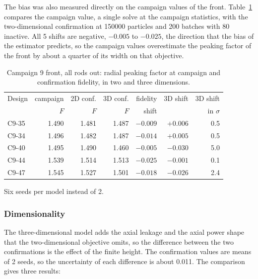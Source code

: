 The bias was also measured directly on the campaign values of the
front. Table~\ref{tab:c9-peaking} compares the campaign value, a single solve
at the campaign statistics, with the two-dimensional confirmation at
\num{150000} particles and 200 batches with 80 inactive. All 5 shifts
are negative, $-0.005$ to $-0.025$, the direction that the bias of the
estimator predicts, so the campaign values overestimate the peaking
factor of the front by about a quarter of its width on that objective.

\begin{table}[htbp]
  \centering
  \begin{threeparttable}
  \caption{Campaign 9 front, all rods out: radial peaking factor at campaign and confirmation fidelity, in two and three dimensions.}
  \label{tab:c9-peaking}
  \small
  \begin{tabular}{@{}lrrrrrr@{}}
    \toprule
    Design & campaign & 2D conf. & 3D conf. & fidelity & 3D shift &
    3D shift \\
     & $F$ & $F$ & $F$ & shift & & in $\sigma$ \\
    \midrule
    C9-35 & 1.490 & 1.481 & 1.487 & $-0.009$ & $+0.006$ & 0.5 \\
    C9-34 & 1.496 & 1.482 & 1.487 & $-0.014$ & $+0.005$ & 0.5 \\
    C9-40\tnote{a} & 1.495 & 1.490 & 1.460 & $-0.005$ & $-0.030$ & 5.0 \\
    C9-44 & 1.539 & 1.514 & 1.513 & $-0.025$ & $-0.001$ & 0.1 \\
    C9-47 & 1.545 & 1.527 & 1.501 & $-0.018$ & $-0.026$ & 2.4 \\
    \bottomrule
  \end{tabular}
  \begin{tablenotes}[flushleft]\footnotesize
    \item[a] Six seeds per model instead of 2.
  \end{tablenotes}
  \end{threeparttable}
\end{table}

\subsubsection{Dimensionality}
\label{sec:res-c9-peak-3d}
The three-dimensional model adds the axial leakage and the axial power
shape that the two-dimensional objective omits, so the difference
between the two confirmations is the effect of the finite height. The
confirmation values are means of 2 seeds, so the uncertainty of each
difference is about 0.011. The comparison gives three results:

